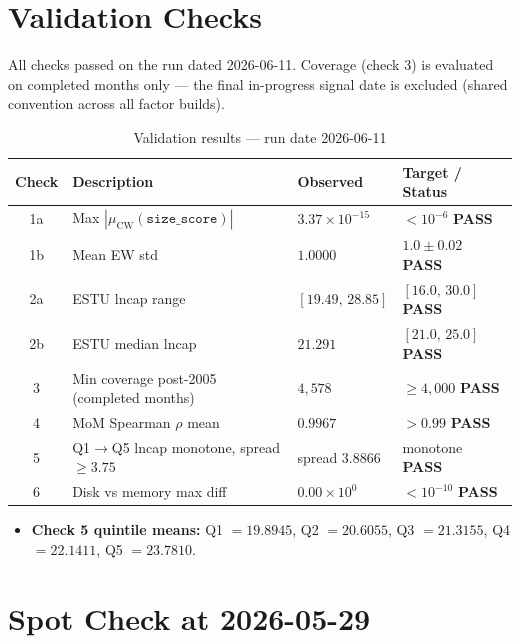 \documentclass[11pt,a4paper]{article}
\newcommand{\PASS}[1]{\textcolor{pass}{\textbf{#1}}}
\begin{document}
\section{Validation Checks}

All checks passed on the run dated 2026-06-11. Coverage (check 3) is evaluated
on completed months only --- the final in-progress signal date is excluded
(shared convention across all factor builds).

\begin{table}[h!]
\centering
\caption{Validation results --- run date 2026-06-11}
\small
\begin{tabular}{clll}
\toprule
\textbf{Check} & \textbf{Description} & \textbf{Observed} & \textbf{Target / Status} \\
\midrule
1a & Max $|\mu_{\text{CW}}(\texttt{size\_score})|$ & $3.37\times10^{-15}$ & $<10^{-6}$ \quad \PASS{PASS} \\
1b & Mean EW std & $1.0000$ & $1.0\pm0.02$ \quad \PASS{PASS} \\
2a & ESTU lncap range & $[19.49,\,28.85]$ & $[16.0,\,30.0]$ \quad \PASS{PASS} \\
2b & ESTU median lncap & $21.291$ & $[21.0,\,25.0]$ \quad \PASS{PASS} \\
3 & Min coverage post-2005 (completed months) & $4{,}578$ & $\geq4{,}000$ \quad \PASS{PASS} \\
4 & MoM Spearman $\rho$ mean & $0.9967$ & $>0.99$ \quad \PASS{PASS} \\
5 & Q1$\to$Q5 lncap monotone, spread $\geq3.75$ & spread $3.8866$ & monotone \quad \PASS{PASS} \\
6 & Disk vs memory max diff & $0.00\times10^{0}$ & $<10^{-10}$ \quad \PASS{PASS} \\
\bottomrule
\end{tabular}
\end{table}

\begin{itemize}[leftmargin=*,topsep=2pt,itemsep=2pt]
  \item \textbf{Check 5 quintile means:} Q1 $=19.8945$, Q2 $=20.6055$, Q3 $=21.3155$, Q4 $=22.1411$, Q5 $=23.7810$.
\end{itemize}

\section{Spot Check at 2026-05-29}
\end{document}
